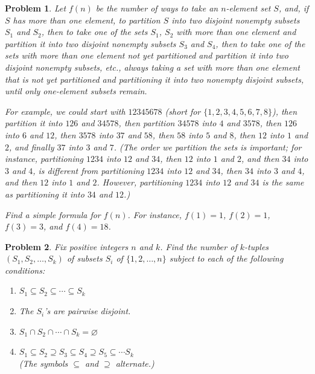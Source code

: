 \documentclass[12pt]{article}
\newtheorem{problem}{Problem}
\begin{document}
\begin{problem}
Let $f(n)$ be the number of ways to take an $n$-element set $S$, and, if $S$ has more than one element, to partition $S$ into two disjoint nonempty subsets $S_1$ and $S_2$, then to take one of the sets $S_1$, $S_2$ with more than one element and partition it into two disjoint nonempty subsets $S_3$ and $S_4$, then to take one of the sets with more than one element not yet partitioned and partition it into two disjoint nonempty subsets, etc., always taking a set with more than one element that is not yet partitioned and partitioning it into two nonempty disjoint subsets, until only one-element subsets remain. 

For example, we could start with $12345678$ (short for $\{1,2,3,4,5,6,7,8\}$), then partition it into $126$ and $34578$, then partition $34578$ into $4$ and $3578$, then $126$ into $6$ and $12$, then $3578$ into $37$ and $58$, then $58$ into $5$ and $8$, then $12$ into $1$ and $2$, and finally $37$ into $3$ and $7$. (The order we partition the sets is important; for instance, partitioning $1234$ into $12$ and $34$, then $12$ into $1$ and $2$, and then $34$ into $3$ and $4$, is different from partitioning $1234$ into $12$ and $34$, then $34$ into $3$ and $4$, and then $12$ into $1$ and $2$. However, partitioning $1234$ into $12$ and $34$ is the same as partitioning it into $34$ and $12$.)

Find a simple formula for $f(n)$. For instance, $f(1) = 1$, $f(2) = 1$, $f(3) = 3$, and $f(4) = 18$.
\end{problem}

\begin{problem}
Fix positive integers $n$ and $k$. Find the number of $k$-tuples $(S_1,S_2,\ldots,S_k)$ of subsets $S_i$ of $\{1,2,\ldots,n\}$ subject to each of the following conditions:
    \begin{enumerate}
        \item $S_1 \subseteq S_2 \subseteq \cdots \subseteq S_k$
        \item The $S_i$’s are pairwise disjoint.
        \item $S_1 \cap S_2 \cap \cdots \cap S_k = \varnothing$
        \item $S_1 \subseteq S_2 \supseteq S_3 \subseteq S_4 \supseteq S_5 \subseteq \cdots S_k$\\
        (The symbols $\subseteq$ and $\supseteq$ alternate.)
    \end{enumerate}
\end{problem}
\end{document}
